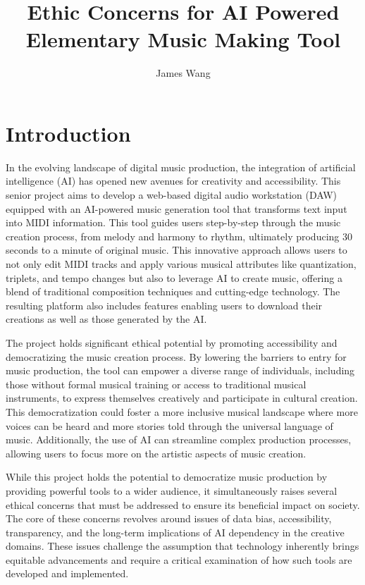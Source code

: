 \documentclass[10pt,twocolumn]{article}
\title{Ethic Concerns for AI Powered Elementary Music Making Tool}
\author{James Wang}
\affiliation{Occidental College}
\begin{document}
\maketitle

\section{Introduction}

In the evolving landscape of digital music production, the integration of artificial intelligence (AI) has opened new avenues for creativity and accessibility. This senior project aims to develop a web-based digital audio workstation (DAW) equipped with an AI-powered music generation tool that transforms text input into MIDI information. This tool guides users step-by-step through the music creation process, from melody and harmony to rhythm, ultimately producing 30 seconds to a minute of original music. This innovative approach allows users to not only edit MIDI tracks and apply various musical attributes like quantization, triplets, and tempo changes but also to leverage AI to create music, offering a blend of traditional composition techniques and cutting-edge technology. The resulting platform also includes features enabling users to download their creations as well as those generated by the AI.

The project holds significant ethical potential by promoting accessibility and democratizing the music creation process. By lowering the barriers to entry for music production, the tool can empower a diverse range of individuals, including those without formal musical training or access to traditional musical instruments, to express themselves creatively and participate in cultural creation. This democratization could foster a more inclusive musical landscape where more voices can be heard and more stories told through the universal language of music. Additionally, the use of AI can streamline complex production processes, allowing users to focus more on the artistic aspects of music creation.

While this project holds the potential to democratize music production by providing powerful tools to a wider audience, it simultaneously raises several ethical concerns that must be addressed to ensure its beneficial impact on society. The core of these concerns revolves around issues of data bias, accessibility, transparency, and the long-term implications of AI dependency in the creative domains. These issues challenge the assumption that technology inherently brings equitable advancements and require a critical examination of how such tools are developed and implemented.
\end{document}
